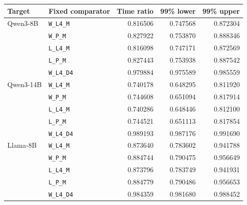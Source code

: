 \begin{tabular}{llrrr}
\toprule
Target & Fixed comparator & Time ratio & 99\% lower & 99\% upper \\
\midrule
Qwen3-8B & \texttt{W\_L4\_M} & 0.816506 & 0.747568 & 0.872304 \\
 & \texttt{W\_P\_M} & 0.827922 & 0.753870 & 0.888346 \\
 & \texttt{L\_L4\_M} & 0.816098 & 0.747171 & 0.872569 \\
 & \texttt{L\_P\_M} & 0.827443 & 0.753938 & 0.887542 \\
 & \texttt{W\_L4\_D4} & 0.979884 & 0.975589 & 0.985559 \\
\addlinespace
Qwen3-14B & \texttt{W\_L4\_M} & 0.740178 & 0.648295 & 0.811920 \\
 & \texttt{W\_P\_M} & 0.744608 & 0.651094 & 0.817914 \\
 & \texttt{L\_L4\_M} & 0.740286 & 0.648446 & 0.812100 \\
 & \texttt{L\_P\_M} & 0.744521 & 0.651113 & 0.817854 \\
 & \texttt{W\_L4\_D4} & 0.989193 & 0.987176 & 0.991690 \\
\addlinespace
Llama-8B & \texttt{W\_L4\_M} & 0.873640 & 0.783602 & 0.941788 \\
 & \texttt{W\_P\_M} & 0.884744 & 0.790475 & 0.956649 \\
 & \texttt{L\_L4\_M} & 0.873796 & 0.783749 & 0.941931 \\
 & \texttt{L\_P\_M} & 0.884779 & 0.790486 & 0.956653 \\
 & \texttt{W\_L4\_D4} & 0.984359 & 0.981680 & 0.988452 \\
\bottomrule
\end{tabular}
